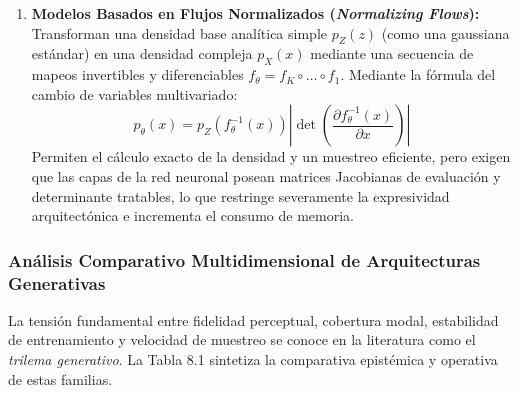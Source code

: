 \begin{enumerate}
    \item \textbf{Modelos Basados en Flujos Normalizados (\textit{Normalizing Flows}):} Transforman una densidad base analítica simple $p_Z(z)$ (como una gaussiana estándar) en una densidad compleja $p_X(x)$ mediante una secuencia de mapeos invertibles y diferenciables $f_\theta = f_K \circ \dots \circ f_1$. Mediante la fórmula del cambio de variables multivariado:
    \begin{equation}
    p_\theta(x) = p_Z(f_\theta^{-1}(x)) \left| \det \left( \frac{\partial f_\theta^{-1}(x)}{\partial x} \right) \right|
    \end{equation}
    Permiten el cálculo exacto de la densidad y un muestreo eficiente, pero exigen que las capas de la red neuronal posean matrices Jacobianas de evaluación y determinante tratables, lo que restringe severamente la expresividad arquitectónica e incrementa el consumo de memoria.
\end{enumerate}

\subsubsection{Análisis Comparativo Multidimensional de Arquitecturas Generativas}

La tensión fundamental entre fidelidad perceptual, cobertura modal, estabilidad de entrenamiento y velocidad de muestreo se conoce en la literatura como el \textit{trilema generativo}. La Tabla 8.1 sintetiza la comparativa epistémica y operativa de estas familias.

